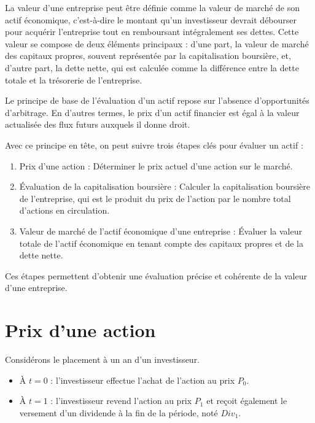 \documentclass[a4paper, 12pt]{report}
\begin{document}
La valeur d'une entreprise peut être définie comme la valeur de marché de son actif économique, c'est-à-dire le montant qu'un investisseur devrait débourser pour acquérir l'entreprise tout en remboursant intégralement ses dettes. Cette valeur se compose de deux éléments principaux : d'une part, la valeur de marché des capitaux propres, souvent représentée par la capitalisation boursière, et, d'autre part, la dette nette, qui est calculée comme la différence entre la dette totale et la trésorerie de l'entreprise.

Le principe de base de l'évaluation d'un actif repose sur l'absence d'opportunités d'arbitrage. En d'autres termes, le prix d'un actif financier est égal à la valeur actualisée des flux futurs auxquels il donne droit.

Avec ce principe en tête, on peut suivre trois étapes clés pour évaluer un actif :

\begin{enumerate}
	\item Prix d'une action : Déterminer le prix actuel d'une action sur le marché.
	\item Évaluation de la capitalisation boursière : Calculer la capitalisation boursière de l'entreprise, qui est le produit du prix de l'action par le nombre total d'actions en circulation.
	\item Valeur de marché de l'actif économique d'une entreprise : Évaluer la valeur totale de l'actif économique en tenant compte des capitaux propres et de la dette nette.
\end{enumerate}

Ces étapes permettent d'obtenir une évaluation précise et cohérente de la valeur d'une entreprise.

\section{Prix d'une action}

Considérons le placement à un an d'un investisseur. 

\begin{itemize}
	\item À \( t = 0 \) : l'investisseur effectue l'achat de l'action au prix \( P_0 \).
	\item À \( t = 1 \) : l'investisseur revend l'action au prix \( P_1 \) et reçoit également le versement d'un dividende à la fin de la période, noté \( Div_1 \).
\end{itemize}
\end{document}
